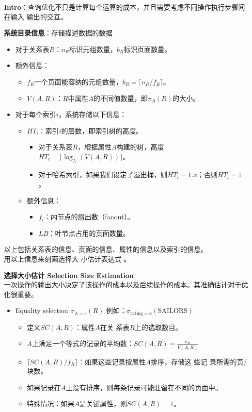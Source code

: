\documentclass[b5paper, twoside]{article}
\let\oldtextbf\textbf
\renewcommand{\textbf}[1]{\textcolor{myblue}{\oldtextbf{#1}}}
\newenvironment{smallmdframed}
  {\begin{mdframed}[linewidth=0pt, backgroundcolor=pink!20]\small}
  {\end{mdframed}}
\begin{document}
\textbf{Intro}：查询优化不只是计算每个运算的成本，并且需要考虑不同操作执行步骤间在输入
输出的交互。

\textbf{系统目录信息}：存储描述数据的数据
\begin{itemize}
	\item 对于关系表$ R $：$ n_R $标识元组数量，$ b_R $标识页面数量。
	\item 额外信息：
	\begin{itemize}
		\item $ f_R $一个页面能容纳的元组数量，$ b_R=\lceil 
		n_R/f_R\rceil $。
		\item $ V(A,R) $：$ R $中属性$ A $的不同值数量，即$ \pi_A(R) $的大小。
	\end{itemize}
	\item 对于每个索引$ i $，系统存储以下信息：
	\begin{itemize}
		\item $ HT_i $：索引$ i $的层数，即索引树的高度。
		\begin{itemize}
			\item 对于关系表$ R $，根据属性$ A $构建的树，高度$ HT_i = \lceil 
			\log_{f_i}(V(A,R)) \rceil $。
			\item 对于哈希索引，如果我们设定了溢出桶，则$ HT_i = 1.x $；否则$ HT_i 
			= 1 $。
		\end{itemize}
			\item 额外信息：
		\begin{itemize}
			\item $ f_i $：内节点的扇出数（fanout）。
			\item $ LB $：叶节点占用的页面数量。
		\end{itemize}
	\end{itemize}
\end{itemize}

\begin{smallmdframed}
	以上包括关系表的信息、页面的信息、属性的信息以及索引的信息。\\
	用以上信息来刻画选择大
	小估计表达式
	。
\end{smallmdframed}

\textbf{选择大小估计 Selection Size Estimation}  
\\一次操作的输出大小决定了该操作的成本以及后续操作的成本。其准确估计对于优化很重要。
\begin{itemize}
	\item {Equality selection} $\sigma_{A=v}(R)$  
	例如：$\sigma_{\text{rating}=8}(\text{SAILORS})$
	\begin{itemize}
		\item 定义$ SC(A,R) $：属性$ A $在关
			系表$ R 
		$上的选取数目。
		\item $ A $上满足一个等式的记录的平均数：$ SC(A,R) = 
		\frac{n_R}{V(A,R)} $
		\item $\lceil SC(A,R)/f_R \rceil$：如果这些记录按属性$ A $排序，存储这
		些记
		录所需的页/块数。
		\item 如果记录在$ A $上没有排序，则每条记录可能驻留在不同的页面中。
		\item 特殊情况：如果$ A $是{关键属性}，则$ SC(A,R) = 1 $。
	\end{itemize}
\end{itemize}
\end{document}
